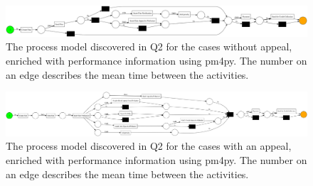 \documentclass[12pt]{report}
\begin{document}
\begin{figure}[H]
  \centering
  \includegraphics[width=\textwidth]{figures/no_appeals_performance.png}
  \caption{The process model discovered in Q2 for the cases without appeal, enriched with performance information using pm4py. The number on an edge describes the mean time between the activities.}
  \label{fig:no_appeals_performance}
\end{figure}

\begin{figure}[H]
  \centering
  \includegraphics[width=\textwidth]{figures/appeals_performance.png}
  \caption{The process model discovered in Q2 for the cases with an appeal, enriched with performance information using pm4py. The number on an edge describes the mean time between the activities.}
  \label{fig:appeals_performance}
\end{figure}
\end{document}
